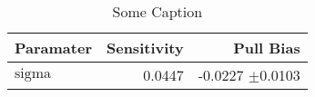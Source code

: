 
\let\oldpm\pm
\renewcommand{\pm}{\ensuremath{\oldpm}}
\begin{table}[h]
\begin{center}
\begin{tabular}{@{}|l|r|r|@{}}
\hline
Paramater & Sensitivity & Pull Bias \\
\hline
$\text{sigma}$ & 0.0447 & -0.0227 \pm 0.0103\\
\hline
\end{tabular}
\caption{Some Caption}
\label{thisTable}
\end{center}
\end{table}
\renewcommand{\pm}{\oldpm}

